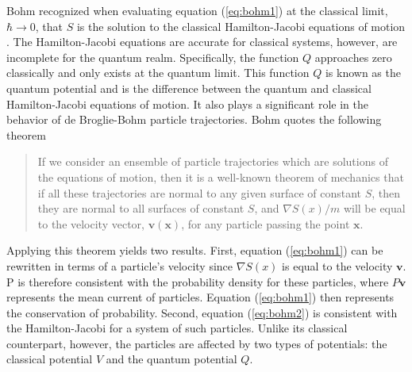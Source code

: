 \documentclass[10pt, reqno]{article}
\begin{document}
  Bohm recognized when evaluating equation (\ref{eq:bohm1}) at the classical limit, $ \hbar \rightarrow 0 $, 
    that $S$ is the solution to the classical Hamilton-Jacobi equations of motion \cite{bohm}.
  The Hamilton-Jacobi equations are accurate for classical systems, however,
    are incomplete for the quantum realm.
  Specifically, the function $Q$ approaches zero classically and only exists at the quantum limit.
  This function $Q$ is known as the quantum potential and is the difference between the quantum and classical Hamilton-Jacobi equations of motion.
  It also plays a significant role in the behavior of de Broglie-Bohm particle trajectories.
  Bohm quotes the following theorem \cite{bohm} 
  \begin{quotation}
    \noindent
    If we consider an ensemble of particle trajectories which are solutions of the equations of motion,
    then it is a well-known theorem of mechanics that if all these trajectories are normal to any given surface of constant $S$,
    then they are normal to all surfaces of constant $S$, 
    and $\nabla S(x) / m $ will be equal to the velocity vector, $\mathbf{v}(\mathbf{x})$,
    for any particle passing the point $ \mathbf{x} $.
  \end{quotation}
  Applying this theorem yields two results.
  First, equation (\ref{eq:bohm1}) can be rewritten in terms of a particle's velocity since $\nabla S(x)$ is equal to the velocity $\mathbf{v}$.
  P is therefore consistent with the probability density for these particles,
    where $P\mathbf{v}$ represents the mean current of particles.
  Equation (\ref{eq:bohm1}) then represents the conservation of probability.
  Second, equation (\ref{eq:bohm2}) is consistent with the Hamilton-Jacobi for a system of such particles.
  Unlike its classical counterpart, however, the particles are affected by two types of potentials: 
    the classical potential $V$ and the quantum potential $Q$.
\end{document}
